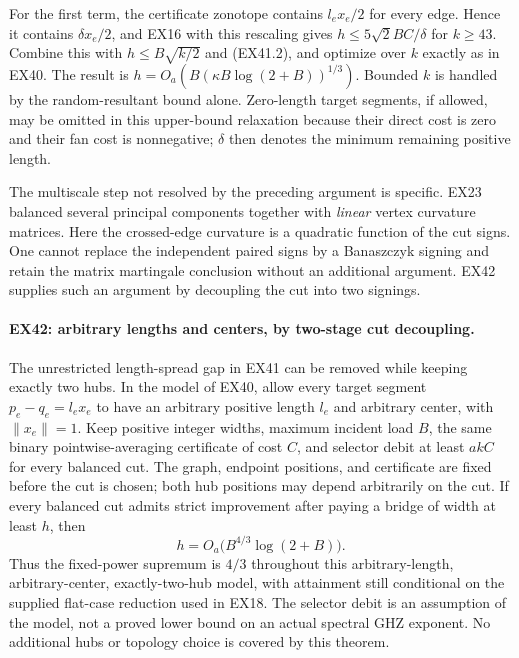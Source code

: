 For the first term, the certificate zonotope contains
$l_ex_e/2$ for every edge. Hence it contains $\delta x_e/2$,
and EX16 with this rescaling gives
$h\le5\sqrt2 BC/\delta$ for $k\ge43$.
Combine this with $h\le B\sqrt{k/2}$ and (EX41.2), and optimize
over $k$ exactly as in EX40. The result is
$h=O_a(B(\kappa B\log(2+B))^{1/3})$.
Bounded $k$ is handled by the random-resultant bound alone.
Zero-length target segments, if allowed, may be omitted in this
upper-bound relaxation because their direct cost is zero and
their fan cost is nonnegative; $\delta$ then denotes the minimum
remaining positive length.

The multiscale step not resolved by the preceding argument is specific.
EX23 balanced
several principal components together with \emph{linear} vertex
curvature matrices. Here the crossed-edge curvature is a
quadratic function of the cut signs. One cannot replace the
independent paired signs by a Banaszczyk signing and retain the
matrix martingale conclusion without an additional argument.
EX42 supplies such an argument by decoupling the cut into two signings.


\paragraph{EX42: arbitrary lengths and centers, by two-stage cut decoupling.}
The unrestricted length-spread gap in EX41 can be removed while keeping
exactly two hubs. In the model of EX40, allow every target segment
$p_e-q_e=l_ex_e$ to have an arbitrary positive length $l_e$ and arbitrary
center, with $\|x_e\|=1$. Keep positive integer widths, maximum incident
load $B$, the same binary pointwise-averaging certificate of cost $C$,
and selector debit at least $akC$ for every balanced cut. The graph,
endpoint positions, and certificate are fixed before the cut is chosen;
both hub positions may depend arbitrarily on the cut. If every balanced cut
admits strict improvement after paying a bridge of width at least $h$,
then
\[
             h=O_a\bigl(B^{4/3}\log(2+B)\bigr).
 \tag{EX42.1}
\]
Thus the fixed-power supremum is $4/3$ throughout this arbitrary-length,
arbitrary-center, exactly-two-hub model, with attainment still
conditional on the supplied flat-case reduction used in EX18. The
selector debit is an assumption of the model, not a proved lower bound
on an actual spectral GHZ exponent. No additional hubs or topology
choice is covered by this theorem.

